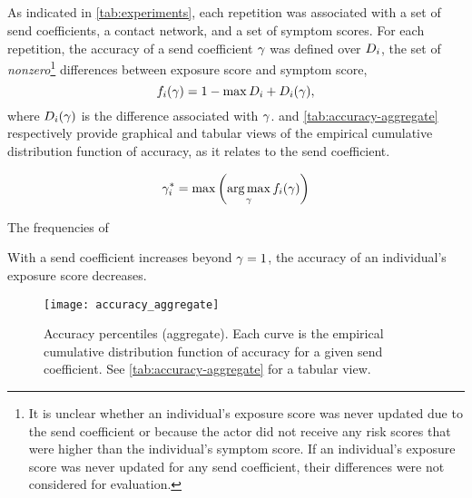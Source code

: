 \subsection{}

As indicated in \cref{tab:experiments}, each repetition was associated with a set of send coefficients, a contact network, and a set of symptom scores. For each repetition, the accuracy of a send coefficient $\gamma$ was defined over $D_i$, the set of \emph{nonzero}\footnote{It is unclear whether an individual's exposure score was never updated due to the send coefficient or because the actor did not receive any risk scores that were higher than the individual's symptom score. If an individual's exposure score was never updated for any send coefficient, their differences were not considered for evaluation.} differences between  exposure score and symptom score,
\begin{equation*}
  f_i(\gamma) = 1 - \max D_i + D_i(\gamma),
\end{equation*}
where $D_i(\gamma)$ is the difference associated with $\gamma$.  and \cref{tab:accuracy-aggregate} respectively provide graphical and tabular views of the empirical cumulative distribution function of accuracy, as it relates to the send coefficient.

\begin{equation*}
  \gamma_i^* = \max \left(\underset{\gamma}{\operatorname{\arg\max}} \, f_i(\gamma)\right)
\end{equation*}

The frequencies of 

With a send coefficient increases beyond $\gamma = 1$, the accuracy of an individual's exposure score decreases.

\begin{figure}[htbp]
  \centering
  \texttt{[image: accuracy\_aggregate]}
  \caption[Accuracy percentiles (aggregate)]{Accuracy percentiles (aggregate). Each curve is the empirical cumulative distribution function of accuracy for a given send coefficient. See \cref{tab:accuracy-aggregate} for a tabular view.}
  \label{fig:accuracy-aggregate}
\end{figure}

